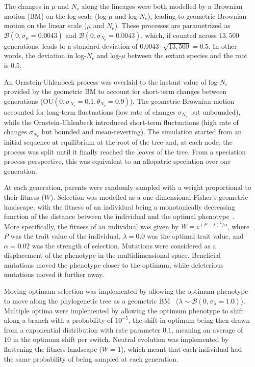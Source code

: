\documentclass{article}
\newcommand{\Multiply}{\cdot}
\newcommand{\e}{\text{e}}
\newcommand{\Ne}{N_{\text{e}}}
\newcommand{\Trait}{P}
\newcommand{\MutationRatePheno}{\mu}
\newcommand{\brownian}{\mathcal{B}}
\begin{document}
\newpage
The changes in $\MutationRatePheno$ and $\Ne$ along the lineages were both modelled by a Brownian motion (BM) on the log scale (log-$\MutationRatePheno$ and log-$\Ne$), leading to geometric Brownian motion on the linear scale ($\MutationRatePheno$ and $\Ne$).
These processes are parametrized as $\brownian \left(0, \sigma_{\MutationRatePheno}=0.0043\right)$ and $\brownian \left(0, \sigma_{\Ne}=0.0043\right)$, which, if counted across $13,500$ generations, leads to a standard deviation of $0.0043 \Multiply \sqrt {13,500} = 0.5$.
In other words, the deviation in log-$\Ne$ and log-$\MutationRatePheno$  between the extant species and the root is $0.5$.

An Ornstein-Uhlenbeck process was overlaid to the instant value of log-$\Ne$ provided by the geometric BM to account for short-term changes between generations ($\text{OU} \left(0, \sigma_{\Ne}=0.1, \theta_{\Ne}=0.9\right)$).
The geometric Brownian motion accounted for long-term fluctuations (low rate of changes $\sigma_{\Ne}$ but unbounded), while the Ornstein-Uhlenbeck introduced short-term fluctuations (high rate of changes $\sigma_{\Ne}$ but bounded and mean-reverting).
The simulation started from an initial sequence at equilibrium at the root of the tree and, at each node, the process was split until it finally reached the leaves of the tree.
From a speciation process perspective, this was equivalent to an allopatric speciation over one generation.

At each generation, parents were randomly sampled with a weight proportional to their fitness ($W$).
Selection was modelled as a one-dimensional Fisher's geometric landscape, with the fitness of an individual being a monotonically decreasing function of the distance between the individual and the optimal phenotype~\citep{tenaillon_utility_2014,blanquart_epistasis_2016}.
More specifically, the fitness of an individual was given by $W = \e^{(\Trait - \lambda)^2/ \alpha}$, where $\Trait$ was the trait value of the individual, $\lambda=0.0$ was the optimal trait value, and $\alpha=0.02$ was the strength of selection.
Mutations were considered as a displacement of the phenotype in the multidimensional space.
Beneficial mutations moved the phenotype closer to the optimum, while deleterious mutations moved it further away.

Moving optimum selection was implemented by allowing the optimum phenotype to move along the phylogenetic tree as a geometric BM~\citep{hansen_stabilizing_1997} ($\lambda \sim \brownian \left(0, \sigma_{\lambda}=1.0\right)$).
Multiple optima were implemented by allowing the optimum phenotype to shift along a branch with a probability of $10^{-5}$, the shift in optimum being then drawn from a exponential distribution with rate parameter $0.1$, meaning an average of $10$ in the optimum shift per switch.
Neutral evolution was implemented by flattening the fitness landscape ($W=1$), which meant that each individual had the same probability of being sampled at each generation.
\end{document}
